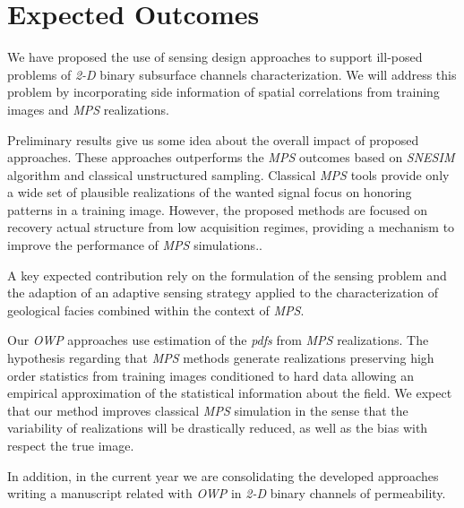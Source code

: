\chapter{Expected Outcomes}

We have proposed the use of sensing design approaches to support ill-posed problems of \emph{2-D} binary subsurface channels characterization. We will address this problem by incorporating side information of spatial correlations from training images and \emph{MPS} realizations.

Preliminary results give us some idea about the overall impact of proposed approaches. These approaches outperforms the \emph{MPS} outcomes based on \emph{SNESIM} algorithm and classical unstructured sampling. Classical \emph{MPS} tools provide only a wide set of plausible realizations of the wanted signal focus on honoring patterns in a training image. However, the proposed methods are focused on recovery actual structure from low acquisition regimes, providing a mechanism to improve the performance of \emph{MPS} simulations..

A key expected contribution rely on the formulation of the sensing problem and the adaption of an adaptive sensing strategy applied to the characterization of geological facies combined within the context of \emph{MPS}.

Our \emph{OWP} approaches use estimation of the \emph{pdfs} from \emph{MPS} realizations. The hypothesis regarding that \emph{MPS} methods generate realizations preserving high order statistics from training images conditioned to hard data allowing an empirical approximation of the statistical information about the field. We expect that our method improves classical \emph{MPS} simulation in the sense that the variability of realizations will be drastically reduced, as well as the bias with respect the true image.

In addition, in the current year we are consolidating the developed approaches writing a manuscript related with \emph{OWP} in \emph{2-D} binary channels of permeability. 










